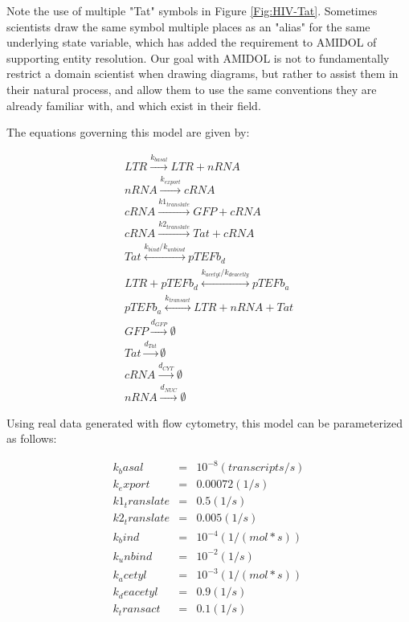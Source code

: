 \documentclass[11pt]{article}
\newcommand{\amidol}{\textsc{AMIDOL}}
\begin{document}
Note the use of multiple "Tat" symbols in Figure \ref{Fig:HIV-Tat}. Sometimes scientists draw the same symbol multiple places as an "alias" for the same underlying state variable, which has added the requirement to \amidol{} of supporting entity resolution.  Our goal with \amidol{} is not to fundamentally restrict a domain scientist when drawing diagrams, but rather to assist them in their natural process, and allow them to use the same conventions they are already familiar with, and which exist in their field.

The equations governing this model are given by:

\begin{eqnarray}
LTR \overset{k_{basal}}{\rightarrow} LTR + nRNA\\
nRNA \overset{k_{export}}{\rightarrow} cRNA\\
  cRNA \overset{k1_{translate}}{\rightarrow} GFP + cRNA\\
  cRNA \overset{k2_{translate}}{\rightarrow} Tat + cRNA\\
  Tat \overset{k_{bind}/k_{unbind}}{\leftrightarrow} pTEFb_d\\
  LTR + pTEFb_d \overset{k_{acetyl}/k_{deacetly}}{\leftrightarrow} pTEFb_a\\
  pTEFb_a \overset{k_{transact}}{\leftrightarrow} LTR + nRNA + Tat\\
  GFP \overset{d_{GFP}}{\rightarrow} \emptyset\\
  Tat \overset{d_{Tat}}{\rightarrow} \emptyset\\
  cRNA \overset{d_{CYT}}{\rightarrow} \emptyset\\
  nRNA \overset{d_{NUC}}{\rightarrow} \emptyset
\end{eqnarray}

Using real data generated with flow cytometry, this model can be parameterized as follows:

\begin{eqnarray}
k_basal &=& 10^{-8} (transcripts/s)\\
  k_export &=& 0.00072 (1/s)\\
  k1_translate &=& 0.5 (1/s)\\
  k2_translate &=& 0.005 (1/s)\\
  k_bind &=& 10^{-4} (1/(mol * s))\\
  k_unbind &=& 10^{-2} (1/s)\\
  k_acetyl &=& 10^{-3} (1/(mol * s))\\
  k_deacetyl &=& 0.9 (1/s)\\
  k_transact &=& 0.1 (1/s)
\end{eqnarray}
\end{document}
